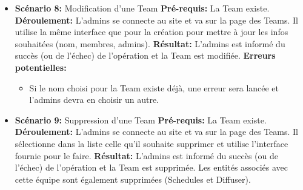 \documentclass[french]{article}
\begin{document}
\begin{itemize}
		\item \textbf{Scénario 8:} Modification d'une Team\newline
		\textbf{Pré-requis:} La Team existe.\newline
		\textbf{Déroulement:} L'admins se connecte au site et va sur la page des Teams. Il utilise la même interface que pour la création pour mettre à jour les infos souhaitées (nom, membres, admins).\newline
		\textbf{Résultat:} L'admins est informé du succès (ou de l'échec) de l'opération et la Team est modifiée.\newline
		\textbf{Erreurs potentielles:} 
			\begin{itemize}
				\item Si le nom choisi pour la Team existe déjà, une erreur sera lancée et l'admins devra en choisir un autre. \newline
			\end{itemize}
		
		\item \textbf{Scénario 9:} Suppression d'une Team\newline
		\textbf{Pré-requis:} La Team existe.\newline
		\textbf{Déroulement:} L'admins se connecte au site et va sur la page des Teams. Il sélectionne dans la liste celle qu'il souhaite supprimer et utilise l'interface fournie pour le faire. \newline
		\textbf{Résultat:} L'admins est informé du succès (ou de l'échec) de l'opération et la Team est supprimée. Les entités associés avec cette équipe sont également supprimées (Schedules et Diffuser). \newline

					
		\end{itemize}
		\newpage
	 
\end{document}
